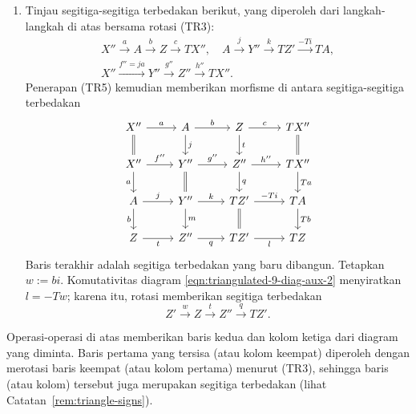 \begin{bukti}
\begin{enumerate}
		\item Tinjau segitiga-segitiga terbedakan berikut, yang diperoleh dari
		langkah-langkah di atas bersama rotasi (TR3):
		\begin{gather*}
			X'' \xrightarrow{a} A \xrightarrow{b} Z \xrightarrow{c} TX'', \quad A \xrightarrow{j} Y'' \xrightarrow{k} TZ' \xrightarrow{-Ti} TA, \\
			X'' \xrightarrow{f'' = ja} Y'' \xrightarrow{g''} Z'' \xrightarrow{h''} TX'' .
		\end{gather*}
		Penerapan (TR5) kemudian memberikan morfisme di antara
		segitiga-segitiga terbedakan
		\begin{equation}\label{eqn:triangulated-9-diag-aux-2}\begin{tikzcd}
			X'' \arrow[r, "a"] \arrow[equal, d] & A \arrow[r, "b"] \arrow[d, "j"] & Z \arrow[r, "c"] \arrow[d, "t"] & TX'' \arrow[equal, d] \\
			X'' \arrow[r, "{f''}"] \arrow[d, "a"'] & Y'' \arrow[r, "{g''}"] \arrow[equal, d] & Z'' \arrow[r, "{h''}"] \arrow[d, "q"] & TX'' \arrow[d, "Ta"] \\
			A \arrow[r, "j"] \arrow[d, "b"'] & Y'' \arrow[r, "k"] \arrow[d, "m"] & TZ' \arrow[r, "{-Ti}"] \arrow[equal, d] & TA \arrow[d, "Tb"] \\
			Z \arrow[r, "t"'] & Z'' \arrow[r, "q"'] & TZ' \arrow[r, "l"'] & TZ
		\end{tikzcd}\end{equation}
		Baris terakhir adalah segitiga terbedakan yang baru dibangun. Tetapkan
		$w := bi$. Komutativitas diagram
		\eqref{eqn:triangulated-9-diag-aux-2} menyiratkan $l = -Tw$; karena itu,
		rotasi memberikan segitiga terbedakan
		\[ Z' \xrightarrow{w} Z \xrightarrow{t} Z'' \xrightarrow{q} TZ' . \]
	\end{enumerate}

	Operasi-operasi di atas memberikan baris kedua dan kolom ketiga dari diagram
	yang diminta. Baris pertama yang tersisa (atau kolom keempat) diperoleh
	dengan merotasi baris keempat (atau kolom pertama) menurut (TR3), sehingga
	baris (atau kolom) tersebut juga merupakan segitiga terbedakan (lihat
	Catatan~\ref{rem:triangle-signs}).


\end{bukti}
